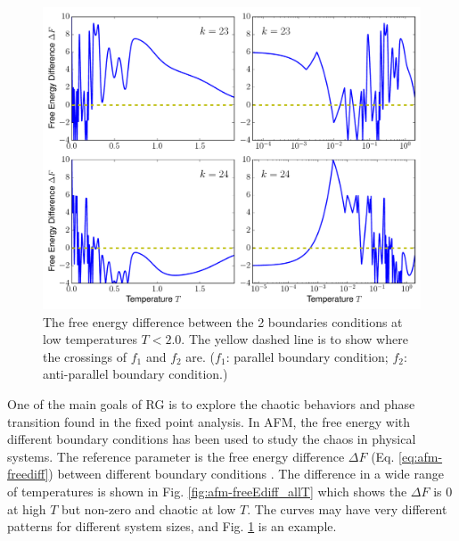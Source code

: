 \begin{figure}[h]
\centering \includegraphics[width=0.8\columnwidth]{Chapter-3/freeEdifference_k23_24.pdf}
\protect\caption{The free energy difference between the 2 boundaries conditions at low temperatures $T<2.0$. The yellow dashed line is to show where the crossings of $f_1$ and $f_2$ are. ($f_1$: parallel boundary condition; $f_2$: anti-parallel boundary condition.) }
\label{fig:afm-freeEdiff} 
\end{figure}

One of the main goals of RG is to explore the chaotic behaviors and phase transition found in the fixed point analysis.  In AFM, the free energy with different boundary conditions has been used to study the chaos in physical systems. The reference parameter is the free energy difference $\Delta F$ (Eq. \ref{eq:afm-freediff}) between different boundary conditions  \cite{wang2015chaos}. The difference in a wide range of temperatures is shown in Fig. \ref{fig:afm-freeEdiff_allT} which shows the $\Delta F$ is 0 at high $T$ but non-zero and chaotic at low $T$. The curves may have very different patterns for different system sizes, and Fig. \ref{fig:afm-freeEdiff}  is an example. 



